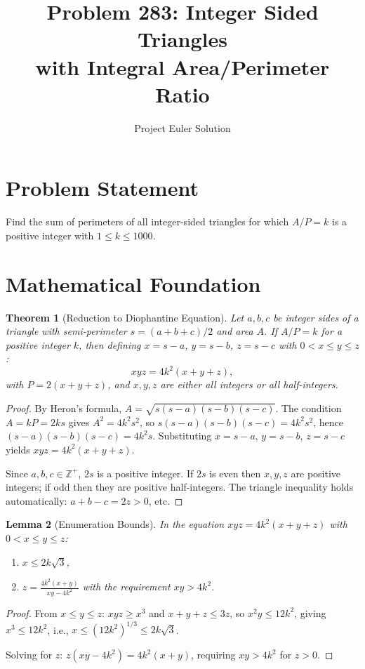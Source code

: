 \documentclass[12pt]{article}
\title{Problem 283: Integer Sided Triangles\\with Integral Area/Perimeter Ratio}
\author{Project Euler Solution}
\date{}
\newtheorem{theorem}{Theorem}
\newtheorem{lemma}[theorem]{Lemma}
\begin{document}
\maketitle

\section{Problem Statement}

Find the sum of perimeters of all integer-sided triangles for which $A/P = k$ is a positive integer with $1 \le k \le 1000$.

\section{Mathematical Foundation}

\begin{theorem}[Reduction to Diophantine Equation]
Let $a,b,c$ be integer sides of a triangle with semi-perimeter $s = (a+b+c)/2$ and area $A$. If $A/P = k$ for a positive integer $k$, then defining $x = s-a$, $y = s-b$, $z = s-c$ with $0 < x \le y \le z$:
\[
xyz = 4k^2(x+y+z),
\]
with $P = 2(x+y+z)$, and $x,y,z$ are either all integers or all half-integers.
\end{theorem}

\begin{proof}
By Heron's formula, $A = \sqrt{s(s-a)(s-b)(s-c)}$. The condition $A = kP = 2ks$ gives $A^2 = 4k^2 s^2$, so $s(s-a)(s-b)(s-c) = 4k^2 s^2$, hence $(s-a)(s-b)(s-c) = 4k^2 s$. Substituting $x = s-a$, $y = s-b$, $z = s-c$ yields $xyz = 4k^2(x+y+z)$.

Since $a,b,c \in \mathbb{Z}^+$, $2s$ is a positive integer. If $2s$ is even then $x,y,z$ are positive integers; if odd then they are positive half-integers. The triangle inequality holds automatically: $a+b-c = 2z > 0$, etc.
\end{proof}

\begin{lemma}[Enumeration Bounds]
In the equation $xyz = 4k^2(x+y+z)$ with $0 < x \le y \le z$:
\begin{enumerate}
\item $x \le 2k\sqrt{3}$,
\item $z = \frac{4k^2(x+y)}{xy - 4k^2}$ with the requirement $xy > 4k^2$.
\end{enumerate}
\end{lemma}

\begin{proof}
From $x \le y \le z$: $xyz \ge x^3$ and $x+y+z \le 3z$, so $x^2 y \le 12k^2$, giving $x^3 \le 12k^2$, i.e., $x \le (12k^2)^{1/3} \le 2k\sqrt{3}$.

Solving for $z$: $z(xy - 4k^2) = 4k^2(x+y)$, requiring $xy > 4k^2$ for $z > 0$.
\end{proof}
\end{document}
